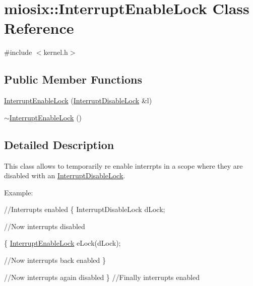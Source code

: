 \hypertarget{classmiosix_1_1_interrupt_enable_lock}{\section{miosix\-:\-:Interrupt\-Enable\-Lock Class Reference}
\label{classmiosix_1_1_interrupt_enable_lock}
}


{\ttfamily \#include $<$kernel.\-h$>$}

\subsection*{Public Member Functions}
\begin{DoxyCompactItemize}
\item 
\hyperlink{classmiosix_1_1_interrupt_enable_lock_ae02c7390bbaf3839a4401b4ea3172173}{Interrupt\-Enable\-Lock} (\hyperlink{classmiosix_1_1_interrupt_disable_lock}{Interrupt\-Disable\-Lock} \&l)
\item 
\hyperlink{classmiosix_1_1_interrupt_enable_lock_a0e1b60ac838afe74d1f7a906e3bb2282}{$\sim$\-Interrupt\-Enable\-Lock} ()
\end{DoxyCompactItemize}


\subsection{Detailed Description}
This class allows to temporarily re enable interrpts in a scope where they are disabled with an \hyperlink{classmiosix_1_1_interrupt_disable_lock}{Interrupt\-Disable\-Lock}.\par
 Example\-: 
\begin{DoxyCode}
\textcolor{comment}{//Interrupts enabled}
\{
    InterruptDisableLock dLock;

    \textcolor{comment}{//Now interrupts disabled}

    \{
        \hyperlink{classmiosix_1_1_interrupt_enable_lock_ae02c7390bbaf3839a4401b4ea3172173}{InterruptEnableLock} eLock(dLock);

        \textcolor{comment}{//Now interrupts back enabled}
    \}

    \textcolor{comment}{//Now interrupts again disabled}
\}
\textcolor{comment}{//Finally interrupts enabled}
\end{DoxyCode}
 

